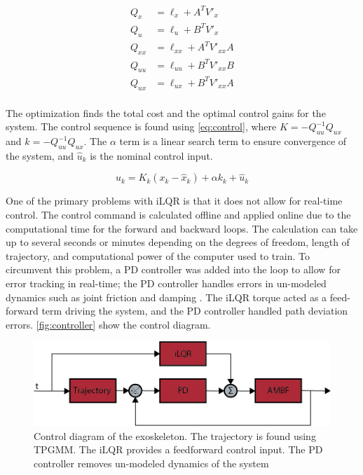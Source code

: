 \begin{equation}
    \begin{split}
        Q_x &= \ell_x + A^T V'_x \\
        Q_u &= \ell_u + B^T V'_x \\
        Q_{xx} &= \ell_{xx} + A^T V'_{xx}A \\
        Q_{uu} &= \ell_{uu} + B^T V'_{xx}B \\
        Q_{ux} &= \ell_{ux} + B^T V'_{xx}A \\
    \end{split}
    \label{eq:deltaQDecomp}
\end{equation}



The optimization finds the total cost and the optimal control gains for the system. The control sequence is found using \autoref{eq:control}, where $K=-Q_{uu}^{-1}Q_{ux}$ and $k=-Q^{-1}_{uu} Q_{ux}$. The $\alpha$ term is a linear search term to ensure convergence of the system, and $\hat{u}_k$ is the nominal control input. 


\begin{equation}
    u_k = K_k (x_k - \hat{x}_k) + \alpha k_k + \hat{u}_k
    \label{eq:control}
\end{equation}

One of the primary problems with iLQR is that it does not allow for real-time control. The control command is calculated offline and applied online due to the computational time for the forward and backward loops. The calculation can take up to several seconds or minutes depending on the degrees of freedom, length of trajectory, and computational power of the computer used to train. To circumvent this problem, a PD controller was added into the loop to allow for error tracking in real-time; the PD controller handles errors in un-modeled dynamics such as joint friction and damping \cite{iLQR_tassa2014}. The iLQR torque acted as a feed-forward term driving the system, and the PD controller handled path deviation errors. \autoref{fig:controller} show the control diagram. 

\begin{figure}[H]
    \centering
    \includegraphics[width=\linewidth]{images/controllers/iLQR.png}
    \caption[iLQR Control Diagram]{Control diagram of the exoskeleton. The trajectory is found using TPGMM. The iLQR provides a feedforward control input. The PD controller removes un-modeled dynamics of the system }
    \label{fig:controller}
\end{figure}

